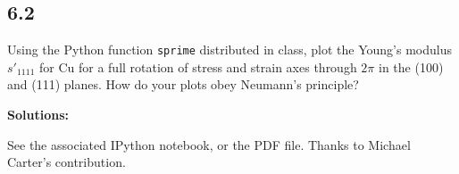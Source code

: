 \documentclass[12pt]{article}
\begin{document}
\subsection{6.2}
Using the Python function \texttt{sprime} distributed in class, plot the Young's modulus $s'_{1111}$ for Cu for a full rotation of stress and strain axes through
$2\pi$ in the \hkl(100) and \hkl(111) planes.
How do your plots obey Neumann's principle?

\textbf{Solutions:}

See the associated IPython notebook, or the PDF file. Thanks to Michael Carter's contribution.


% 
% 

\end{document}
